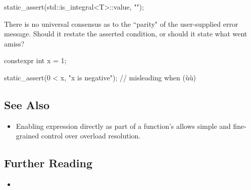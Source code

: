 \begin{emcppslisting}[emcppsbatch=e7]
static_assert(std::is_integral<T>::value, "");
\end{emcppslisting}

There is no universal consensus as to the ``parity" of the user-supplied error message.  Should it restate the asserted condition, or should it state what went amiss?
\begin{emcppshiddenlisting}[emcppsbatch=e8]
constexpr int x = 1;
\end{emcppshiddenlisting}
\begin{emcppslisting}[emcppsbatch=e8]
static_assert(0 < x, "x is negative");
   // misleading when (ù{}ù)
\end{emcppslisting}

\subsection[See Also]{See Also}\label{see-also}

\begin{itemize}
\item{%
Enabling expression  directly as part of a function's   allows simple and fine-grained control over overload resolution.}
\end{itemize}

\subsection[Further Reading]{Further Reading}\label{further-reading}

\begin{itemize}
\item{\cite{klarer04}}
\end{itemize}


